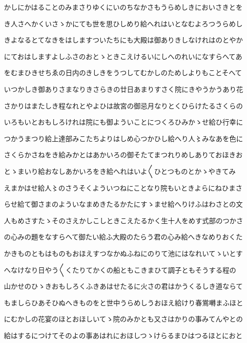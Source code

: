\documentclass[a4paper,11pt,landscape]{ltjtarticle}
\begin{document}
かしにかはることのみまさりゆくにいのちなかさもうらめしきにおいさきとを
\par\medskip
き人さへかくいさゝかにても世を思ひしめり給へれはいとなむよろつうらめし
\par\medskip
きよなるとてなきをはしますついたちにも大殿は御ありきしなけれはのとやか
\par\medskip
にておはしますよしふさのおとゝときこえけるいにしへのれいになすらへてあ
\par\medskip
をむまひきせちゑの日内のきしきをうつしてむかしのためしよりもことそへて
\par\medskip
いつかしき御ありさまなりきさらきの廿日あまりすさく院にきやうかうあり花
\par\medskip
さかりはまたしき程なれとやよひは故宮の御忌月なりとくひらけたるさくらの
\par\medskip
いろもいとおもしろけれは院にも御よういことにつくろひみかゝせ給ひ行幸に
\par\medskip
つかうまつり給上達部みこたちよりはしめ心つかひし給へり人〻みなあを色に
\par\medskip
さくらかさねをき給みかとはあかいろの御そたてまつれりめしありておほきお
\par\medskip
とゝまいり給おなしあかいろをき給へれはいよ〱ひとつものとかゝやきてみ
\par\medskip
えまかはせ給人〻のさうそくよういつねにことなり院もいときよらにねひまさ
\par\medskip
らせ給て御さまのよういなまめきたるかたにすゝませ給へりけふはわさとの文
\par\medskip
人もめさすたゝそのさえかしこしときこえたるかく生十人をめす式部のつかさ
\par\medskip
の心みの題をなすらへて御たい給ふ大殿のたらう君の心み給へきなめりおくた
\par\medskip
かきものともはものもおほえすつなかぬふねにのりて池にはなれいてゝいとす
\par\medskip
へなけなり日やう〱くたりてかくの船ともこきまひて調子ともそうする程の
\par\medskip
山かせのひゝきおもしろくふきあはせたるに火さの君はかうくるしき道ならて
\par\medskip
もましらひあそひぬへきものをと世中うらめしうおほえ給けり春鴬囀まふほと
\par\medskip
にむかしの花宴のほとおほしいてゝ院のみかとも又さはかりの事みてんやとの
\par\medskip
給はするにつけてそのよの事あはれにおほしつゝけらるまひはつるほとにおと
\par\medskip
\end{document}
